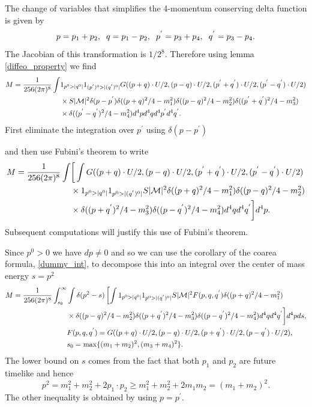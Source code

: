 The change of variables that simplifies the 4-momentum conserving delta function is given by
\begin{equation}
p=p_1+p_2,\hspace{2mm} q=p_1-p_2, \hspace{2mm} p^{'}=p_3+p_4, \hspace{2mm} q^{'}=p_3-p_4.
\end{equation}
The Jacobian of this transformation is $1/2^{8}$.  Therefore using lemma \ref{diffeo_property} we find
{\small
\begin{align}\label{M_eq1}
M=\frac{1}{256(2\pi)^8 }\int & 1_{p^0>|q^0|} 1_{(p^{'})^0>|(q^{'})^0|} G((p+q)\cdot U/2,(p-q)\cdot  U/2,(p^{'}+q^{'})\cdot U/2, (p^{'}-q^{'})\cdot U/2)\notag\\ 
&\times S |\mathcal{M}|^2  \delta(p-p^{'})\delta((p+q)^2/4-m_1^2)\delta((p-q)^2/4-m_2^2)\delta((p^{'}+q^{'})^2/4-m_3^2)\notag\\
&\times\delta((p^{'}-q^{'})^2/4-m_4^2)d^4pd^4qd^4p^{'}d^4q^{'}.
\end{align}
}
First eliminate the integration over $p^{'}$ using $\delta(p-p^{'})$

 and then use Fubini's theorem to write
\begin{align}\label{use_fubini}
M=\frac{1}{256(2\pi)^8 }\int &\bigg[ \int G((p+q)\cdot U/2,(p-q)\cdot  U/2,(p^{'}+q^{'})\cdot U/2, (p^{'}-q^{'})\cdot U/2)\notag\\ 
&\times  1_{p^0>|q^0|} 1_{p^0>|(q^{'})^0|}S |\mathcal{M}|^2 \delta((p+q)^2/4-m_1^2)\delta((p-q)^2/4-m_2^2)\notag\\
&\times \delta((p+q^{'})^2/4-m_3^2)\delta((p-q^{'})^2/4-m_4^2)d^4qd^4q^{'}\bigg]d^4p.
\end{align}
Subsequent computations will justify this use of Fubini's theorem.


Since $p^0>0$ we have $dp\neq 0$ and so we can use the corollary of the coarea formula, \ref{dummy_int}, to decompose this into an integral over the center of mass energy $s=p^2$
{\small
\begin{align}\label{M_eq2}
M=\frac{1}{256(2\pi)^8 }\int_{s_0}^\infty&\int \delta(p^2-s) \left[\int 1_{p^0>|q^0|} 1_{p^0>|(q^{'})^0|}  S |\mathcal{M}|^2  F(p,q,q^{'}) \delta((p+q)^2/4-m_1^2)\right.\notag\\
&\times\delta((p-q)^2/4-m_2^2)\delta((p+q^{'})^2/4-m_3^2)\delta((p-q^{'})^2/4-m_4^2)d^4qd^4q^{'}\bigg]d^4pds,\notag\\
&F(p,q,q^{'})=G((p+q)\cdot U/2,(p-q)\cdot  U/2,(p+q^{'})\cdot U/2, (p-q^{'})\cdot U/2),\notag\\
&s_0=\max\{(m_1+m_2)^2,(m_3+m_4)^2\}.
\end{align}
}
The lower bound on $s$ comes from the fact that both $p_1$ and $p_2$ are future timelike and hence 
\begin{equation}
p^2=m_1^2+m_2^2+2p_1\cdot p_2\geq m_1^2+m_2^2+2m_1m_2=(m_1+m_2)^2.
\end{equation}
The other inequality is obtained by using $p=p^{'}$. 

